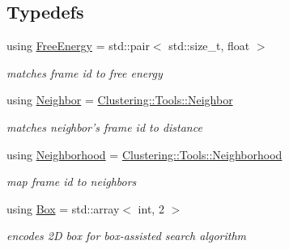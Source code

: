 \subsection*{Typedefs}
\begin{DoxyCompactItemize}
\item 
\hypertarget{namespaceClustering_1_1Density_af77cfa169766fdc136b680121101496d}{using \hyperlink{namespaceClustering_1_1Density_af77cfa169766fdc136b680121101496d}{Free\-Energy} = std\-::pair$<$ std\-::size\-\_\-t, float $>$}\label{namespaceClustering_1_1Density_af77cfa169766fdc136b680121101496d}

\begin{DoxyCompactList}\small\item\em matches frame id to free energy \end{DoxyCompactList}\item 
\hypertarget{namespaceClustering_1_1Density_ac3c667ff26944b877f55b8a20deb2ce7}{using \hyperlink{namespaceClustering_1_1Density_ac3c667ff26944b877f55b8a20deb2ce7}{Neighbor} = \hyperlink{namespaceClustering_1_1Tools_a63a5e933e8b64deefbb1128bbbdc3dd1}{Clustering\-::\-Tools\-::\-Neighbor}}\label{namespaceClustering_1_1Density_ac3c667ff26944b877f55b8a20deb2ce7}

\begin{DoxyCompactList}\small\item\em matches neighbor's frame id to distance \end{DoxyCompactList}\item 
\hypertarget{namespaceClustering_1_1Density_a23a99ccebc9d9cf5c9df6af14559d539}{using \hyperlink{namespaceClustering_1_1Density_a23a99ccebc9d9cf5c9df6af14559d539}{Neighborhood} = \hyperlink{namespaceClustering_1_1Tools_ad2b6f4886446247db27ece196d76575c}{Clustering\-::\-Tools\-::\-Neighborhood}}\label{namespaceClustering_1_1Density_a23a99ccebc9d9cf5c9df6af14559d539}

\begin{DoxyCompactList}\small\item\em map frame id to neighbors \end{DoxyCompactList}\item 
\hypertarget{namespaceClustering_1_1Density_a0ffd1a27b8195eaf74276ea91ef920ad}{using \hyperlink{namespaceClustering_1_1Density_a0ffd1a27b8195eaf74276ea91ef920ad}{Box} = std\-::array$<$ int, 2 $>$}\label{namespaceClustering_1_1Density_a0ffd1a27b8195eaf74276ea91ef920ad}

\begin{DoxyCompactList}\small\item\em encodes 2\-D box for box-\/assisted search algorithm \end{DoxyCompactList}\end{DoxyCompactItemize}
